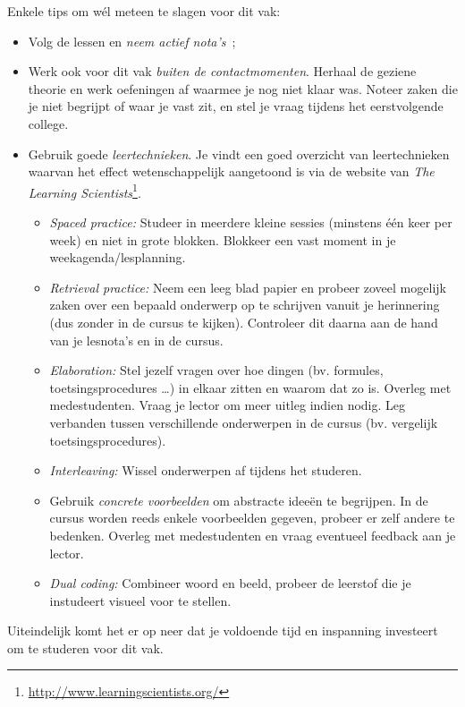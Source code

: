Enkele tips om w\'el meteen te slagen voor dit vak:

\begin{itemize}
  \item Volg de lessen en \emph{neem actief nota's}~\parencite{Lundin2020};
  \item Werk ook voor dit vak \emph{buiten de contactmomenten}. Herhaal de geziene theorie en werk oefeningen af waarmee je nog niet klaar was. Noteer zaken die je niet begrijpt of waar je vast zit, en stel je vraag tijdens het eerstvolgende college.
  \item Gebruik goede \emph{leertechnieken}. Je vindt een goed overzicht van leertechnieken waarvan het effect wetenschappelijk aangetoond is via de website van \emph{The Learning Scientists}\footnote{\url{http://www.learningscientists.org/}}.
  \begin{itemize}
    \item \emph{Spaced practice:} Studeer in meerdere kleine sessies (minstens één keer per week) en niet in grote blokken. Blokkeer een vast moment in je weekagenda/lesplanning.
    \item \emph{Retrieval practice:} Neem een leeg blad papier en probeer zoveel mogelijk zaken over een bepaald onderwerp op te schrijven vanuit je herinnering (dus zonder in de cursus te kijken). Controleer dit daarna aan de hand van je lesnota's en in de cursus.
    \item \emph{Elaboration:} Stel jezelf vragen over hoe dingen (bv. formules, toetsingsprocedures \ldots) in elkaar zitten en waarom dat zo is. Overleg met medestudenten. Vraag je lector om meer uitleg indien nodig. Leg verbanden tussen verschillende onderwerpen in de cursus (bv. vergelijk toetsingsprocedures).
    \item \emph{Interleaving:} Wissel onderwerpen af tijdens het studeren.
    \item Gebruik \emph{concrete voorbeelden} om abstracte idee\"en te begrijpen. In de cursus worden reeds enkele voorbeelden gegeven, probeer er zelf andere te bedenken. Overleg met medestudenten en vraag eventueel feedback aan je lector.
    \item \emph{Dual coding:} Combineer woord en beeld, probeer de leerstof die je instudeert visueel voor te stellen.
  \end{itemize}
\end{itemize}

Uiteindelijk komt het er op neer dat je voldoende tijd en inspanning investeert om te studeren voor dit vak.

